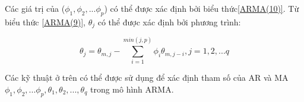       Các giá trị của ($\phi_{1},\phi_{2},...\phi_{p}$) có thể được xác định bởi biểu thức\eqref{ARMA(10)}. Từ biểu thức \eqref{ARMA(9)}, $\theta_{j}$ có thể được xác định bởi phương trình:\par
      \begin{equation}\label{ARMA(11)}
          \theta_{j}=\theta_{m,j}-\sum_{i=1}^{min(j,p)}\phi_{i}\theta_{m,j-i},j=1,2,...q
      \end{equation}\par
      Các kỹ thuật ở trên có thể được sử dụng để xác định tham số của AR và MA $\phi_{1},\phi_{2},...\phi_{p},\theta_{1},\theta_{2},...,\theta_{q}$ trong mô hình ARMA.